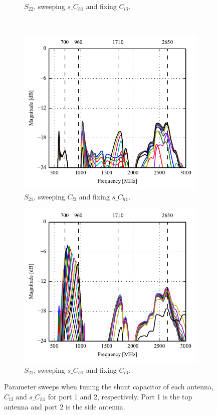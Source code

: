 \begin{figure}[htbp]
\begin{subfigure}{0.49\linewidth}
        \caption{$S_{22}$, sweeping $s\_C_{h1}$ and fixing $C_{l3}$.}
    \end{subfigure}
    \\
    \begin{subfigure}{0.49\linewidth}
        \centering
        \includegraphics{img/tech_sol/nonresonant/simulation/freespace/s12_top_sweep.pdf}
        \caption{$S_{21}$, sweeping $C_{l3}$ and fixing $s\_C_{h1}$.}
    \end{subfigure}
    \hfill
    \begin{subfigure}{0.49\linewidth}
        \centering
        \includegraphics{img/tech_sol/nonresonant/simulation/freespace/s21_side_sweep.pdf}
        \caption{$S_{21}$, sweeping $s\_C_{h1}$ and fixing $C_{l3}$.}
    \end{subfigure}
    \caption{Parameter sweeps when tuning the shunt capacitor of each antenna, $C_{l3}$ and $s\_C_{h1}$ for port 1 and 2, respectively. Port 1 is the top antenna and port 2 is the side antenna.}
    \label{fig:ant3sweeps}
\end{figure}

